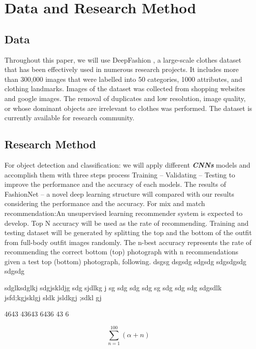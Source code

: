 \section{Data and Research Method}
\subsection{Data}
Throughout this paper, we will use DeepFashion \cite{iwata2011fashion}, a large-scale clothes dataset that has been effectively used in numerous research projects. It includes more than 300,000 images that were labelled into 50 categories, 1000 attributes, and clothing landmarks. Images of the dataset was collected from shopping websites and google images. The removal of duplicates and low resolution, image quality, or whose dominant objects are irrelevant to clothes was performed. The dataset is currently available for research community.

\subsection{Research Method}
For object detection and classification: we will apply different \textit{\textbf{CNNs}} models and accomplish them with three steps process Training – Validating – Testing to improve the performance and the accuracy of each models. The results of FashionNet – a novel deep learning structure  \cite{simonyan2014very,deng2014deep} will compared with our results considering the performance and the accuracy.
For mix and match recommendation:An unsupervised learning recommender system is expected to develop. Top N accuracy will be used as the rate of recommending. Training and testing dataset will be generated by splitting the top and the bottom of the outfit from full-body outfit images randomly. The n-best accuracy represents the rate of recommending the correct bottom (top) photograph with n recommendations given a test top (bottom) photograph, following. dsgsg dsgsdg sdgsdg sdgsdgsdg sdgsdg 

sdglksdglkj sdgjskldjg sdg sjdlkg j
sg sdg 
sdg sdg 
sg
sdg
sdg 
sdg 
sdgsdlk jsfd;kgjsklgj sldk jsldkgj ;sdkl gj

4643 43643 6436 43 6

\begin{equation}
    \sum_{n=1}^{100}(\alpha+n)
\end{equation}